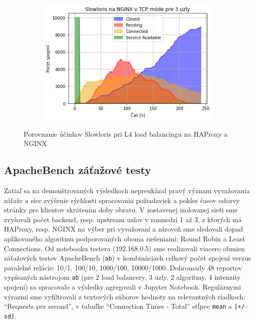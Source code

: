 \documentclass[12pt, a4paper]{article}
\begin{document}
\begin{figure}[h!]
\begin{subfigure}[t]{.32\textwidth}
	\end{subfigure}
	\begin{subfigure}[t]{.32\textwidth}
  		\centering
  		\includegraphics[width=\textwidth]{images/nginx-3-tcp.png}
	\end{subfigure}
	\caption{Porovnanie účinkov Slowloris pri L4 load balancingu na HAProxy a NGINX}
\end{figure}

\subsection{ApacheBench záťažové testy}
Zatiaľ sa na demonštrovaných výsledkoch nepreukázal pravý význam vyvažovania záťaže a síce
zvýšenie rýchlosti spracovania požiadaviek a pokles časov odozvy stránky pre klientov 
skrátením doby obratu. V zostavenej izolovanej sieti sme zvyšovali počet backend, resp. upstream 
uzlov v rozmedzí 1 až 3, z ktorých má HAProxy, resp. NGINX na výber pri vyvažovaní a zároveň sme
sledovali dopad aplikovaného algoritmu podporovaných oboma riešeniami: Round Robin a Least Connections.
Od notebooku testera (192.168.0.5) sme realizovali viacero obmien záťažových testov ApacheBench 
(\verb|ab|) v kombináciach celkový počet spojení verzus paralelné relácie: 10/1, 100/10, 1000/100,
10000/1000. Dohromady 48 reportov vypísaných nástrojom \verb|ab| (pre 2 load balancery, 3 uzly, 2 algoritmy,
4 intenzity spojení) sa spracovalo a výsledky agregovali v Jupyter Notebook. Regulárnymi výrazmi sme
vyfiltrovali z textových súborov hodnoty na relevantných riadkoch: \enquote{Requests per second}, v tabuľke 
\enquote{Connection Times - Total} stĺpce \verb|mean| a \verb|[+/-sd]|.
\end{document}
